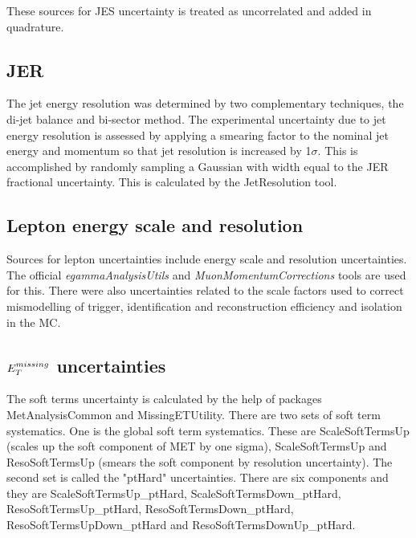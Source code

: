 These sources for JES uncertainty is treated as uncorrelated and added in quadrature.
\subsection{JER}
The jet energy resolution was determined by two complementary techniques, the di-jet balance and bi-sector method. 
The experimental uncertainty due to jet energy resolution is assessed by applying a smearing factor to the nominal jet energy and momentum so that jet resolution is increased by 1$\sigma$. This is accomplished by randomly sampling a Gaussian with width equal to the JER fractional uncertainty. This is calculated by the JetResolution tool. 

\subsection{Lepton energy scale and resolution}
Sources for lepton uncertainties include energy scale and resolution uncertainties. The official \textit{egammaAnalysisUtils} and \textit{MuonMomentumCorrections}  tools are used for this. There were also uncertainties related to the scale factors used to correct mismodelling of trigger, identification and reconstruction efficiency and isolation in the MC. %
\subsection{$E_{T}^{missing}$ uncertainties}
The soft terms uncertainty is calculated by the help of packages MetAnalysisCommon and MissingETUtility. There are two sets of soft term systematics. One is the global soft term systematics. These are ScaleSoftTermsUp (scales up the soft component of MET by one sigma), ScaleSoftTermsUp and ResoSoftTermsUp (smears the soft component by resolution uncertainty). The second set is called the "ptHard" uncertainties. There are six components and they are ScaleSoftTermsUp\_ptHard, ScaleSoftTermsDown\_ptHard, ResoSoftTermsUp\_ptHard, ResoSoftTermsDown\_ptHard, ResoSoftTermsUpDown\_ptHard and ResoSoftTermsDownUp\_ptHard.
